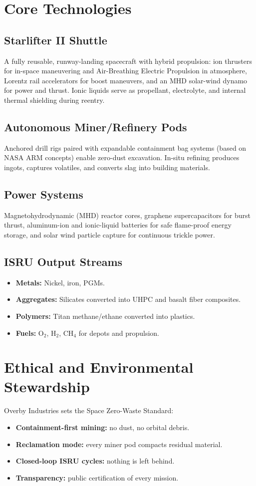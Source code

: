 \documentclass[12pt]{article}
\begin{document}
\section{Core Technologies}

\subsection{Starlifter II Shuttle}
A fully reusable, runway-landing spacecraft with hybrid propulsion: ion thrusters for in-space maneuvering and Air-Breathing Electric Propulsion in atmosphere, Lorentz rail accelerators for boost maneuvers, and an MHD solar-wind dynamo for power and thrust. Ionic liquids serve as propellant, electrolyte, and internal thermal shielding during reentry.

\subsection{Autonomous Miner/Refinery Pods}
Anchored drill rigs paired with expandable containment bag systems (based on NASA ARM concepts) enable zero-dust excavation. In-situ refining produces ingots, captures volatiles, and converts slag into building materials.

\subsection{Power Systems}
Magnetohydrodynamic (MHD) reactor cores, graphene supercapacitors for burst thrust, aluminum-ion and ionic-liquid batteries for safe flame-proof energy storage, and solar wind particle capture for continuous trickle power.

\subsection{ISRU Output Streams}
\begin{itemize}
    \item \textbf{Metals:} Nickel, iron, PGMs.
    \item \textbf{Aggregates:} Silicates converted into UHPC and basalt fiber composites.
    \item \textbf{Polymers:} Titan methane/ethane converted into plastics.
    \item \textbf{Fuels:} O$_2$, H$_2$, CH$_4$ for depots and propulsion.
\end{itemize}

\section{Ethical and Environmental Stewardship}
Overby Industries sets the Space Zero-Waste Standard:
\begin{itemize}
    \item \textbf{Containment-first mining:} no dust, no orbital debris.
    \item \textbf{Reclamation mode:} every miner pod compacts residual material.
    \item \textbf{Closed-loop ISRU cycles:} nothing is left behind.
    \item \textbf{Transparency:} public certification of every mission.
\end{itemize}
\end{document}

